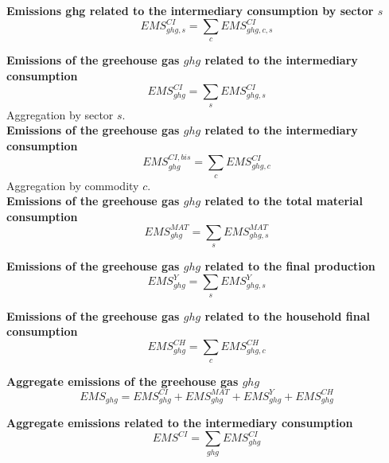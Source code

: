 \documentclass[12pt]{article}
\numberwithin{equation}{section}
\begin{document}
\noindent\textbf{Emissions ghg related to the intermediary consumption by sector $s$} \\
\begin{dmath}
EMS^{CI}_{ghg, s} = \sum_{c} EMS^{CI}_{ghg, c, s}
\end{dmath}

\noindent\textbf{Emissions of the greehouse gas $ghg$ related to the intermediary consumption} \\
\begin{dmath}
EMS^{CI}_{ghg} = \sum_{s} EMS^{CI}_{ghg, s}
\end{dmath}
Aggregation by sector $s$. \\

\noindent\textbf{Emissions of the greehouse gas $ghg$ related to the intermediary consumption} \\
\begin{dmath}
EMS^{CI,bis}_{ghg} = \sum_{c} EMS^{CI}_{ghg, c}
\end{dmath}
Aggregation by commodity $c$. \\

\noindent\textbf{Emissions of the greehouse gas $ghg$ related to the total material consumption} \\
\begin{dmath}
EMS^{MAT}_{ghg} = \sum_{s} EMS^{MAT}_{ghg, s}
\end{dmath}

\noindent\textbf{Emissions of the greehouse gas $ghg$ related to the final production} \\
\begin{dmath}
EMS^{Y}_{ghg} = \sum_{s} EMS^{Y}_{ghg, s}
\end{dmath}

\noindent\textbf{Emissions of the greehouse gas $ghg$ related to the household final consumption} \\
\begin{dmath}
EMS^{CH}_{ghg} = \sum_{c} EMS^{CH}_{ghg, c}
\end{dmath}

\noindent\textbf{Aggregate emissions of the greehouse gas $ghg$} \\
\begin{dmath}
EMS_{ghg} = EMS^{CI}_{ghg} + EMS^{MAT}_{ghg} + EMS^{Y}_{ghg} + EMS^{CH}_{ghg}
\end{dmath}

\noindent\textbf{Aggregate emissions related to the intermediary consumption} \\
\begin{dmath}
EMS^{CI} = \sum_{ghg} EMS^{CI}_{ghg}
\end{dmath}
\end{document}
